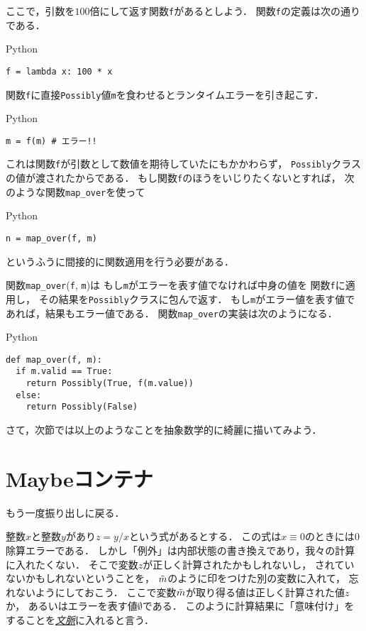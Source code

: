 \documentclass[a5paper,draft]{jsbook}
\newcommand{\programminglanguage}[1]{\textsf{#1}}
\newcommand{\python}{\programminglanguage{Python}}
\newcommand{\keyword}[1]{{\underline{\emph{#1}}}}
\newcommand{\code}[1]{\texttt{#1}}
\newenvironment{pythoncode}{\begin{itembox}[r]{\python}}{\end{itembox}}
\newcommand{\mathMaybeVar}[1]{\Tilde{#1}}
\newcommand{\mathNothing}{\emptyset}
\begin{document}
ここで，引数を$100$倍にして返す関数\code{f}があるとしよう．
関数\code{f}の定義は次の通りである．
\begin{pythoncode}
\begin{verbatim}
f = lambda x: 100 * x
\end{verbatim}
\end{pythoncode}

関数\code{f}に直接\code{Possibly}値\code{m}を食わせるとランタイムエラーを引き起こす．
\begin{pythoncode}
\begin{verbatim}
m = f(m) # エラー!!
\end{verbatim}
\end{pythoncode}
これは関数\code{f}が引数として数値を期待していたにもかかわらず，
\code{Possibly}クラスの値が渡されたからである．
もし関数\code{f}のほうをいじりたくないとすれば，
次のような関数\code{map\_over}を使って
\begin{pythoncode}
\begin{verbatim}
n = map_over(f, m)
\end{verbatim}
\end{pythoncode}
というふうに間接的に関数適用を行う必要がある．

関数\code{map\_over}(\code{f}, \code{m})は
もし\code{m}がエラーを表す値でなければ中身の値を
関数\code{f}に適用し，
その結果を\code{Possibly}クラスに包んで返す．
もし\code{m}がエラー値を表す値であれば，結果もエラー値である．
関数\code{map\_over}の実装は次のようになる．
\begin{pythoncode}
\begin{verbatim}
def map_over(f, m):
  if m.valid == True:
    return Possibly(True, f(m.value))
  else:
    return Possibly(False)
\end{verbatim}
\end{pythoncode}

さて，次節では以上のようなことを抽象数学的に綺麗に描いてみよう．

\section{Maybeコンテナ}

もう一度振り出しに戻る．

整数$x$と整数$y$があり$z=y/x$という式があるとする．
この式は$x\equiv0$のときには$0$除算エラーである．
しかし「例外」は内部状態の書き換えであり，我々の計算に入れたくない．
そこで変数$z$が正しく計算されたかもしれないし，
されていないかもしれないということを，
$\mathMaybeVar{m}$のように印をつけた別の変数に入れて，
忘れないようにしておこう．
ここで変数$\mathMaybeVar{m}$が取り得る値は正しく計算された値$z$か，
あるいはエラーを表す値$\mathNothing$である．
このように計算結果に「意味付け」をすることを\keyword{文脈}に入れると言う．
\end{document}
